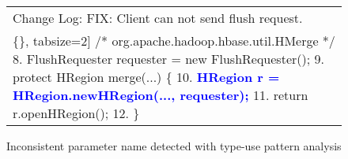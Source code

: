 \begin{figure}[!htb]
\begin{minipage}{0.47\textwidth}
\begin{tabular}{p{}}
Change Log: FIX: Client can not send flush request.
\vspace{-2mm}
\begin{Verbatim}[commandchars=\\\{\}, tabsize=2]
 /* org.apache.hadoop.hbase.util.HMerge */
 8. FlushRequester requester = new FlushRequester();
 9. protect HRegion merge(...)  \{
10. \textcolor{blue}{\bf HRegion r = HRegion.newHRegion(..., requester);  }
11.  return r.openHRegion();
12. \} 
 \end{Verbatim} 
 \vspace{-4mm}
 \\  \hline
 \end{tabular}
 \caption{Inconsistent parameter name detected with type-use pattern analysis}
 \label{fig:usageExample}
 \end{minipage}
 \end{figure}